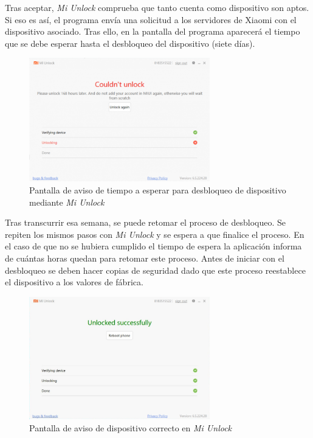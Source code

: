 \documentclass[12pt,a4paper,onecolumn,oneside]{report}
\begin{document}
Tras aceptar, \textit{Mi Unlock} comprueba que tanto cuenta como dispositivo son aptos. Si eso es así, el programa envía una solicitud a los servidores de Xiaomi con el dispositivo asociado. Tras ello, en la pantalla del programa aparecerá el tiempo que se debe esperar hasta el desbloqueo del dispositivo (siete días).

\begin{figure}[H] 
\centering
  \includegraphics[width=0.7\textwidth]{figuras/root4.png}
  \caption[Pantalla de aviso de tiempo a esperar para desbloqueo de dispositivo mediante \textit{Mi Unlock}]{Pantalla de aviso de tiempo a esperar para desbloqueo de dispositivo mediante \textit{Mi Unlock}\\
  }
  \label{fig:root4}
\end{figure}

Tras transcurrir esa semana, se puede retomar el proceso de desbloqueo. Se repiten los mismos pasos con \textit{Mi Unlock} y se espera a que finalice el proceso. En el caso de que no se hubiera cumplido el tiempo de espera la aplicación informa de cuántas horas quedan para retomar este proceso. Antes de iniciar con el desbloqueo se deben hacer copias de seguridad dado que este proceso reestablece el dispositivo a los valores de fábrica.

\begin{figure}[H] 
\centering
  \includegraphics[width=0.7\textwidth]{figuras/root5.png}
  \caption[Pantalla de aviso de dispositivo correcto en \textit{Mi Unlock}]{Pantalla de aviso de dispositivo correcto en \textit{Mi Unlock}\\
  }
  \label{fig:root5}
\end{figure}
\end{document}
